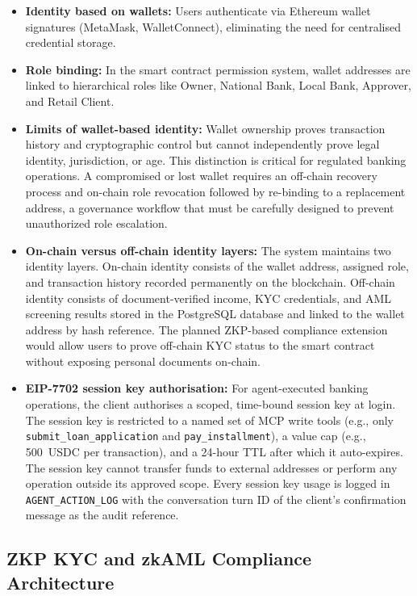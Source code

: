 \documentclass[12pt, a4paper]{report}
\begin{document}
\begin{itemize}[noitemsep]
\item \textbf{Identity based on wallets:} Users authenticate via Ethereum wallet signatures (MetaMask, WalletConnect), eliminating the need for centralised credential storage.
\item \textbf{Role binding:} In the smart contract permission system, wallet addresses are linked to hierarchical roles like Owner, National Bank, Local Bank, Approver, and Retail Client.
\item \textbf{Limits of wallet-based identity:} Wallet ownership proves transaction history and cryptographic control but cannot independently prove legal identity, jurisdiction, or age. This distinction is critical for regulated banking operations. A compromised or lost wallet requires an off-chain recovery process and on-chain role revocation followed by re-binding to a replacement address, a governance workflow that must be carefully designed to prevent unauthorized role escalation.
\item \textbf{On-chain versus off-chain identity layers:} The system maintains two identity layers. On-chain identity consists of the wallet address, assigned role, and transaction history recorded permanently on the blockchain. Off-chain identity consists of document-verified income, KYC credentials, and AML screening results stored in the PostgreSQL database and linked to the wallet address by hash reference. The planned ZKP-based compliance extension would allow users to prove off-chain KYC status to the smart contract without exposing personal documents on-chain.
\item \textbf{EIP-7702 session key authorisation:} For agent-executed banking operations, the client authorises a scoped, time-bound session key at login. The session key is restricted to a named set of MCP write tools (e.g., only \texttt{submit\_loan\_application} and \texttt{pay\_installment}), a value cap (e.g., 500~USDC per transaction), and a 24-hour TTL after which it auto-expires. The session key cannot transfer funds to external addresses or perform any operation outside its approved scope. Every session key usage is logged in \texttt{AGENT\_ACTION\_LOG} with the conversation turn ID of the client's confirmation message as the audit reference.
\end{itemize}

\subsection{ZKP KYC and zkAML Compliance Architecture}
\label{sec:identity}
\end{document}
